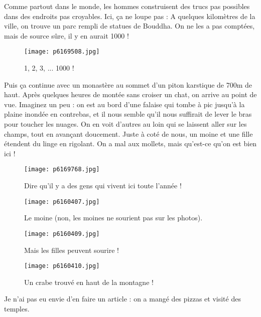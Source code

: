 \documentclass{book}
\begin{document}
Comme partout dans le monde, les hommes construisent des trucs pas possibles dans des endroits pas croyables. Ici, ça ne loupe pas : A quelques kilomètres de la ville, on trouve un parc rempli de statues de Bouddha. On ne les a pas comptées, mais de source sûre, il y en aurait 1000 !


\begin{figure}[h]
\centering
\texttt{[image: p6169508.jpg]}
\caption*{1, 2, 3, ... 1000 !}
\end{figure}

Puis ça continue avec un monastère au sommet d'un piton karstique de 700m de haut. Après quelques heures de montée sans croiser un chat, on arrive au point de vue. Imaginez un peu : on est au bord d'une falaise qui tombe à pic jusqu'à la plaine inondée en contrebas, et il nous semble qu'il nous suffirait de lever le bras pour toucher les nuages. On en voit d'autres au loin qui se laissent aller sur les champs, tout en avançant doucement. Juste à coté de nous, un moine et une fille étendent du linge en rigolant. On a mal aux mollets, mais qu'est-ce qu'on est bien ici !


\begin{figure}[h]
\centering
\texttt{[image: p6169768.jpg]}
\caption*{Dire qu'il y a des gens qui vivent ici toute l'année !}
\end{figure}


\begin{figure}[h]
\centering
\texttt{[image: p6160407.jpg]}
\caption*{Le moine (non, les moines ne sourient pas sur les photos).}
\end{figure}


\begin{figure}[h]
\centering
\texttt{[image: p6160409.jpg]}
\caption*{Mais les filles peuvent sourire !}
\end{figure}


\begin{figure}[h]
\centering
\texttt{[image: p6160410.jpg]}
\caption*{Un crabe trouvé en haut de la montagne !}
\end{figure}



 Je n'ai pas eu envie d'en faire un article : on a mangé des pizzas et visité des temples.
\end{document}
